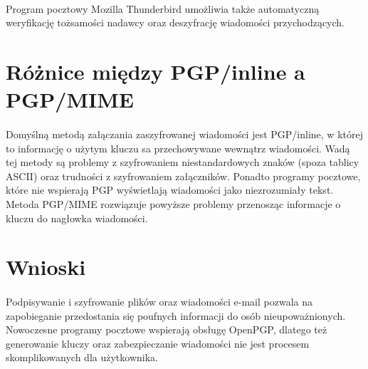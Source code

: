 \documentclass[wide,a4paper,titlepage,12pt] {article}
\begin{document}
  \paragraph{}
  Program pocztowy Mozilla Thunderbird umożliwia także automatyczną weryfikację tożsamości nadawcy oraz deszyfrację wiadomości przychodzących.

  \section{Różnice między PGP/inline a PGP/MIME}
  \paragraph{}
  Domyślną metodą załączania zaszyfrowanej wiadomości jest PGP/inline, w której to informację o użytym kluczu sa przechowywane wewnątrz wiadomości. Wadą tej metody są problemy z szyfrowaniem niestandardowych znaków (spoza tablicy ASCII) oraz trudności z szyfrowaniem załączników. Ponadto programy pocztowe, które nie wspierają PGP wyświetlają wiadomości jako niezrozumiały tekst. Metoda PGP/MIME rozwiązuje powyższe problemy przenosząc informacje o kluczu do nagłowka wiadomości.

  \section{Wnioski}
  \paragraph{}
  Podpisywanie i szyfrowanie plików oraz wiadomości e-mail pozwala na zapobieganie przedostania się poufnych informacji do osób nieupoważnionych. Nowoczesne programy pocztowe wspierają obsługę OpenPGP, dlatego też generowanie kluczy oraz zabezpieczanie wiadomości nie jest procesem skomplikowanych dla użytkownika.
\end{document}
